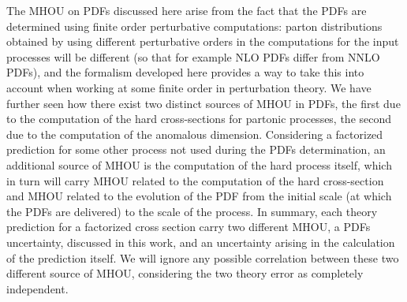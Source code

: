     The MHOU on PDFs discussed here arise from the fact that the PDFs are determined using finite order
    perturbative computations: parton distributions obtained by using different perturbative orders in the computations
    for the input processes will be different (so that for example NLO PDFs differ from NNLO PDFs), and the formalism
    developed here provides a way to take this into account when working at some finite order in
    perturbation theory. 
    We have further seen how there exist two distinct sources of MHOU in PDFs, the first due to the computation
    of the hard cross-sections for partonic processes, the second due to the computation of the anomalous dimension.
    Considering a factorized prediction for some other process not used during the PDFs determination, 
    an additional source of MHOU is the computation of the hard process itself, which in turn will 
    carry MHOU related to the computation of the hard cross-section and MHOU related to the evolution of the PDF
    from the initial scale (at which the PDFs are delivered) to the scale of the process.
    In summary, each theory prediction for a factorized cross section carry two different MHOU,
    a PDFs uncertainty, discussed in this work, and an uncertainty arising in the calculation of the prediction itself. 
    We will ignore any possible correlation between these two different source of MHOU, 
    considering the two theory error as completely independent.
    
